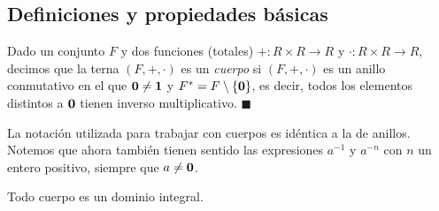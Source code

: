 \subsection{Definiciones y propiedades básicas}
\begin{definition}[Cuerpo] \label{definicion_cuerpo}
Dado un conjunto $F$ y dos funciones (totales) $+ \colon R \times R \to R$ y $\cdot \colon R \times R \to R$, decimos que la terna $(F, +, \cdot)$ es un \emph{cuerpo} si $(F, +, \cdot)$ es un anillo conmutativo en el que $\mathbf{0} \neq \mathbf{1}$ y $F^\ast = F \setminus \{\mathbf{0}\}$, es decir, todos los elementos distintos a $\mathbf{0}$ tienen inverso multiplicativo. 
\hfill$\blacksquare$
\end{definition}

La notación utilizada para trabajar con cuerpos es idéntica a la de anillos. Notemos que ahora también tienen sentido las expresiones $a^{-1}$ y $a^{-n}$ con $n$ un entero positivo, siempre que $a \neq \mathbf{0}$.


\begin{proposition} \label{cuerpos_son_dominios_integrales}
Todo cuerpo es un dominio integral.
\end{proposition}

